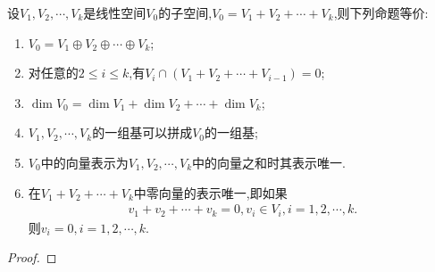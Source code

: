 \documentclass[../../main.tex]{subfiles}%
\begin{document}
\begin{theorem}[直和的等价条件]\label{theorem:直和的等价条件}
设\(V_1,V_2,\cdots,V_k\)是线性空间\(V_0\)的子空间,\(V_0 = V_1 + V_2+\cdots+V_k\),则下列命题等价:
\begin{enumerate}[(1)]
\item \label{theorem:直和的等价条件1}\(V_0 = V_1\oplus V_2\oplus\cdots\oplus V_k\);
\item \label{theorem:直和的等价条件2}对任意的\(2\leqslant  i\leqslant  k\),有\(V_i\cap(V_1 + V_2+\cdots+V_{i - 1}) = 0\);
\item \label{theorem:直和的等价条件3}\(\dim V_0=\dim V_1+\dim V_2+\cdots+\dim V_k\);
\item \label{theorem:直和的等价条件4}\(V_1,V_2,\cdots,V_k\)的一组基可以拼成\(V_0\)的一组基;
\item \label{theorem:直和的等价条件5}\(V_0\)中的向量表示为\(V_1,V_2,\cdots,V_k\)中的向量之和时其表示唯一.
\item \label{theorem:直和的等价条件6}在$ V_1 + V_2+\cdots+V_k$中零向量的表示唯一,即如果
\begin{align*}
v_1+v_2+\cdots+v_k=0,v_i\in V_i,i=1,2,\cdots,k.
\end{align*}
则$v_i=0,i=1,2,\cdots,k.$
\end{enumerate}
\end{theorem}
\begin{proof}

\end{proof}
\end{document}
